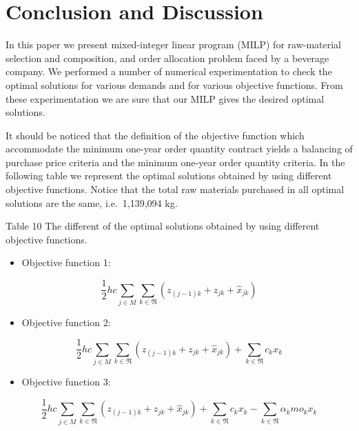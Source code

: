 \documentclass[preprint, 3p,
authoryear]{elsarticle} %
\providecommand{\tightlist}{%
  \setlength{\itemsep}{0pt}\setlength{\parskip}{0pt}}
\begin{document}
\hypertarget{conclusion-and-discussion}{%
\section{Conclusion and Discussion}\label{conclusion-and-discussion}}

In this paper we present mixed-integer linear program (MILP) for
raw-material selection and composition, and order allocation problem
faced by a beverage company. We performed a number of numerical
experimentation to check the optimal solutions for various demands and
for various objective functions. From these experimentation we are sure
that our MILP gives the desired optimal solutions.

It should be noticed that the definition of the objective function which
accommodate the minimum one-year order quantity contract yields a
balancing of purchase price criteria and the minimum one-year order
quantity criteria. In the following table we represent the optimal
solutions obtained by using different objective functions. Notice that
the total raw materials purchased in all optimal solutions are the same,
i.e.~1,139,094 kg.

Table 10 The different of the optimal solutions obtained by using
different objective functions.

\begin{itemize}
\tightlist
\item
  Objective function 1:
\end{itemize}

\[
\frac{1}{2} hc \sum_{j \in M} \sum_{k \in \mathfrak{N}} (z_{(j-1)k} + z_{jk} + \hat{x}_{jk})
\]

\begin{itemize}
\tightlist
\item
  Objective function 2:
\end{itemize}

\[
\frac{1}{2} hc \sum_{j \in M} \sum_{k \in \mathfrak{N}} (z_{(j-1)k} + z_{jk} + \hat{x}_{jk}) + \sum_{k \in \mathfrak{N}} c_k x_k
\]

\begin{itemize}
\tightlist
\item
  Objective function 3:
\end{itemize}

\[
\frac{1}{2} hc \sum_{j \in M} \sum_{k \in \mathfrak{N}} (z_{(j-1)k} + z_{jk} + \hat{x}_{jk}) + \sum_{k \in \mathfrak{N}} c_k x_k - \sum_{k \in \mathfrak{N}} \alpha_k mo_k x_k
\]
\end{document}
